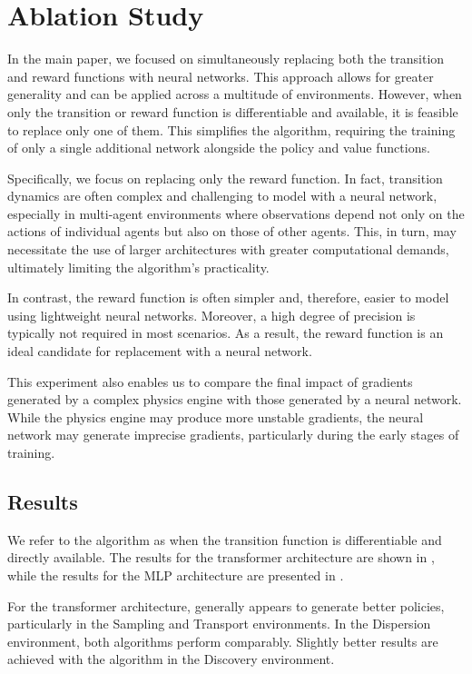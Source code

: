 \section{Ablation Study}\label{apx:ablation}
In the main paper, we focused on simultaneously replacing both the transition and reward functions with neural networks. This approach allows for greater generality and can be applied across a multitude of environments. However, when only the transition or reward function is differentiable and available, it is feasible to replace only one of them. This simplifies the algorithm, requiring the training of only a single additional network alongside the policy and value functions.

Specifically, we focus on replacing only the reward function. In fact, transition dynamics are often complex and challenging to model with a neural network, especially in multi-agent environments where observations depend not only on the actions of individual agents but also on those of other agents. This, in turn, may necessitate the use of larger architectures with greater computational demands, ultimately limiting the algorithm's practicality.

In contrast, the reward function is often simpler and, therefore, easier to model using lightweight neural networks. Moreover, a high degree of precision is typically not required in most scenarios. As a result, the reward function is an ideal candidate for replacement with a neural network.

This experiment also enables us to compare the final impact of gradients generated by a complex physics engine with those generated by a neural network. While the physics engine may produce more unstable gradients, the neural network may generate imprecise gradients, particularly during the early stages of training.

\subsection{Results}
We refer to the \fname{} algorithm as \fnamer{} when the transition function is differentiable and directly available. The results for the transformer architecture are shown in , while the results for the MLP architecture are presented in .

For the transformer architecture, \fname{} generally appears to generate better policies, particularly in the Sampling and Transport environments. In the Dispersion environment, both algorithms perform comparably. Slightly better results are achieved with the \fnamer{} algorithm in the Discovery environment.

